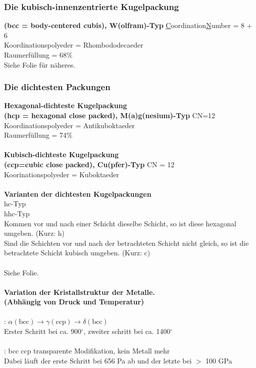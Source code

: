 \documentclass{article}
\begin{document}
\subsubsection{Die kubisch-innenzentrierte Kugelpackung}
\textbf{(bcc = body-centered cubis), W(olfram)-Typ}
\underline{C}oordination\underline{N}umber = 8 + 6\\
Koordinationspolyeder = Rhombododecaeder\\
Raumerfüllung = 68\%\\
Siehe Folie für näheres.
\newpage
\subsubsection{Die dichtesten Packungen}
\textbf{Hexagonal-dichteste Kugelpackung\\(hcp = hexagonal close packed), M(a)g(nesium)-Typ}
CN=12\\
Koordinationspolyeder = Antikuboktaeder\\
Raumerfüllung = 74\%\\\\
\textbf{Kubisch-dichteste Kugelpackung\\(ccp=cubic close packed), Cu(pfer)-Typ}
CN = 12\\
Koorinationspolyeder = Kuboktaeder\\\\
\textbf{Varianten der dichtesten Kugelpackungen}\\
hc-Typ\\
hhc-Typ\\
Kommen vor und nach einer Schicht dieselbe Schicht, so ist diese hexagonal umgeben. (Kurz: h)\\
Sind die Schichten vor und nach der betrachteten Schicht nicht gleich, so ist die betrachtete Schicht kubisch umgeben. (Kurz: c)\\\\
Siehe Folie.\\\\
\textbf{Variation der Kristallstruktur der Metalle.\\(Abhängig von Druck und Temperatur)}\\\\
: $\alpha \left(\mathrm{bcc}\right) \rightarrow \gamma \left(\mathrm{ccp}\right) \rightarrow \delta \left(\mathrm{bcc}\right)$\\
Erster Schritt bei ca. 900$^\circ$, zweiter schritt bei ca. 1400$^\circ$\\\\
: bcc \ce{->} ccp \ce{-> -> ->} transparente Modifikation, kein Metall mehr\\
Dabei läuft der erste Schritt bei 656 Pa ab und der letzte bei $>$ 100 GPa
\end{document}
